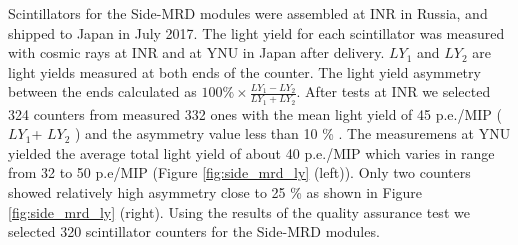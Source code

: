 

Scintillators for the Side-MRD modules were assembled at INR in Russia, and shipped to Japan in July 2017. 
The light yield for each scintillator was measured with cosmic rays at INR and at YNU in Japan after delivery.  
$LY_{1}$ and $LY_{2}$ are light yields measured at both ends of the counter.
The light yield asymmetry between the ends calculated as $100\% \times \frac{LY_{1}-LY_{2}}{LY_{1}+LY_{2}}$.
After tests at INR we selected 324 counters from measured 332 ones with the mean light yield of 45 p.e./MIP ( $LY_{1}$+ $LY_{2}$ ) and the asymmetry value less than 10 \% . 
The measuremens at YNU yielded the average total light yield of about 40 p.e./MIP which varies in range  from 32 to 50 p.e/MIP  (Figure \ref{fig:side_mrd_ly} (left)). 
Only two counters  showed relatively high asymmetry close to 25 \% as shown in Figure \ref{fig:side_mrd_ly} (right). 
Using the results of the quality assurance test  we selected 320 scintillator counters for the Side-MRD modules. 

